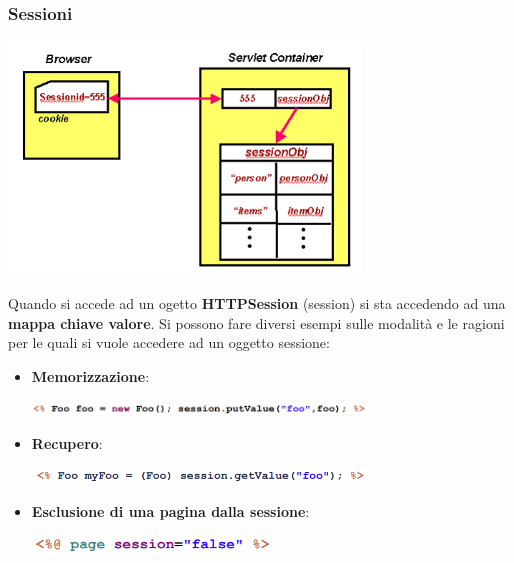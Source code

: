 \documentclass[12pt]{article}
\begin{document}
\subsubsection{Sessioni}
\begin{center}
    \includegraphics[width = 0.70\textwidth]{Images/206.png}
\end{center}
Quando si accede ad un ogetto \textbf{HTTPSession} (session) si sta accedendo ad una \textbf{mappa chiave valore}.
Si possono fare diversi esempi sulle modalità e le ragioni per le quali si vuole accedere ad un oggetto sessione:
\begin{itemize}
    \item \textbf{Memorizzazione}:
    \begin{center}
        \includegraphics[width = 0.70\textwidth]{Images/207.png}
    \end{center}
    \item \textbf{Recupero}:
    \begin{center}
        \includegraphics[width = 0.70\textwidth]{Images/208.png}
    \end{center}
    \item \textbf{Esclusione di una pagina dalla sessione}:
    \begin{center}
        \includegraphics[width = 0.50\textwidth]{Images/209.png}
    \end{center}
\end{itemize}
\end{document}
